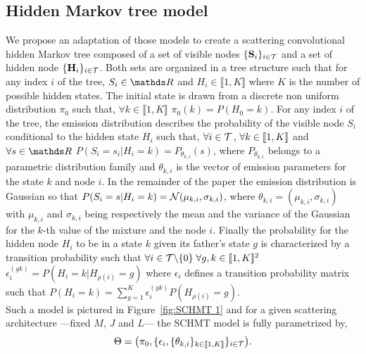 \documentclass{article}
\begin{document}
  \subsection{Hidden Markov tree model}
    \label{subsec:SCHMT/HMT model}
    We propose an adaptation of those models to create a scattering convolutional hidden Markov tree composed of a set of visible nodes $\{{\bf S}_{i}\}_{i \in \mathcal{T}}$ and a set of hidden node $\{{\bf H}_{i}\}_{i \in \mathcal{T}}$. Both sets are organized in a tree structure such that for any index $i$ of the tree, $S_{i} \in \dsR$ and $H_{i} \in \llbracket 1,K \rrbracket$ where $K$ is the number of possible hidden states.
    The initial state is drawn from a discrete non uniform distribution $\pi_{0}$ such that, $\forall k \in \llbracket 1,K \rrbracket$ $\pi_{0}(k) = P(H_{0}=k)$.
    For any index $i$ of the tree, the emission distribution describes the probability of the visible node $S_{i}$ conditional to the hidden state $H_{i}$ such that, $\forall i \in \mathcal{T} \, ,\, \forall k \in \llbracket1,K\rrbracket$ and $\forall s \in \dsR$ $P(S_{i}=s_{i}|H_{i}=k) = P_{\theta_{k,i}}(s)$, where $P_{\theta_{k,i}}$ belongs to a parametric distribution family and $\theta_{k,i}$ is the vector of emission parameters for the state $k$ and node $i$. In the remainder of the paper the emission distribution is Gaussian so that $P(S_{i}=s | H_{i}=k) = \mathcal{N}(\mu_{k,i},\sigma_{k,i})$, where $\theta_{k,i}=(\mu_{k,i},\sigma_{k,i})$ with $\mu_{k,i}$ and $\sigma_{k,i}$ being respectively the mean and the variance of the Gaussian for the $k$-th value of the mixture and the node $i$.
    Finally the probability for the hidden node $H_{i}$ to be in a state $k$ given its father's state $g$ is characterized by a transition probability such that $\forall i \in \mathcal{T} \backslash \{ 0 \} \; \forall g,k \in \llbracket1,K\rrbracket^{2}$ $\epsilon_{i}^{(gk)} = P(H_{i}= k | H_{\rho(i)}=g)$ where $\epsilon_{i}$ defines a transition probability matrix such that $P(H_{i}=k) = \sum_{g=1}^{K} \epsilon_{i}^{(gk)} P(H_{\rho(i)}=g)$.\\

    Such a model is pictured in Figure~\ref{fig:SCHMT 1} and for a given scattering architecture ---\ie fixed $M$, $J$ and $L$--- the SCHMT model is fully parametrized by,
    \begin{equation}
      \Theta = \big(\pi_{0}, \{ \epsilon_{i}, \{ \theta_{k,i} \}_{k\in\llbracket1,K\rrbracket} \}_{i\in\mathcal{T}}\big).
      \label{eq:SCHMT - parameters}
    \end{equation}
    
\end{document}
